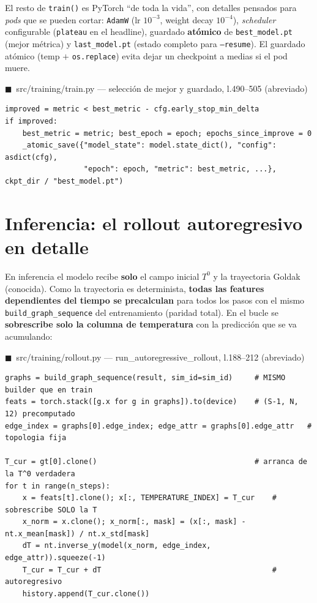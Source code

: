 \documentclass[11pt]{article}
\theoremstyle{definition}
\theoremstyle{plain}
\newcommand{\srcref}[1]{\par\smallskip\noindent
  {\footnotesize\ttfamily\textcolor{srcblue}{$\blacksquare$\ #1}}\par\vspace{1pt}}
\begin{document}
El resto de \texttt{train()} es PyTorch ``de toda la vida'', con detalles pensados
para \emph{pods} que se pueden cortar: \texttt{AdamW} (lr $10^{-3}$, weight decay
$10^{-4}$), \emph{scheduler} configurable (\texttt{plateau} en el headline),
guardado \textbf{atómico} de \texttt{best\_model.pt} (mejor métrica) y
\texttt{last\_model.pt} (estado completo para \texttt{--resume}). El guardado atómico
(temp $+$ \texttt{os.replace}) evita dejar un checkpoint a medias si el pod muere.

\srcref{src/training/train.py — selección de mejor y guardado, l.490--505 (abreviado)}
\begin{lstlisting}
improved = metric < best_metric - cfg.early_stop_min_delta
if improved:
    best_metric = metric; best_epoch = epoch; epochs_since_improve = 0
    _atomic_save({"model_state": model.state_dict(), "config": asdict(cfg),
                  "epoch": epoch, "metric": best_metric, ...}, ckpt_dir / "best_model.pt")
\end{lstlisting}

\section{Inferencia: el rollout autoregresivo en detalle}
\label{sec:rollout}

En inferencia el modelo recibe \textbf{solo} el campo inicial $T^0$ y la trayectoria
Goldak (conocida). Como la trayectoria es determinista, \textbf{todas las features
dependientes del tiempo se precalculan} para todos los pasos con el mismo
\texttt{build\_graph\_sequence} del entrenamiento (paridad total). En el bucle se
\textbf{sobrescribe solo la columna de temperatura} con la predicción que se va
acumulando:

\srcref{src/training/rollout.py — run\_autoregressive\_rollout, l.188--212 (abreviado)}
\begin{lstlisting}
graphs = build_graph_sequence(result, sim_id=sim_id)     # MISMO builder que en train
feats = torch.stack([g.x for g in graphs]).to(device)    # (S-1, N, 12) precomputado
edge_index = graphs[0].edge_index; edge_attr = graphs[0].edge_attr   # topologia fija

T_cur = gt[0].clone()                                    # arranca de la T^0 verdadera
for t in range(n_steps):
    x = feats[t].clone(); x[:, TEMPERATURE_INDEX] = T_cur    # sobrescribe SOLO la T
    x_norm = x.clone(); x_norm[:, mask] = (x[:, mask] - nt.x_mean[mask]) / nt.x_std[mask]
    dT = nt.inverse_y(model(x_norm, edge_index, edge_attr)).squeeze(-1)
    T_cur = T_cur + dT                                       # autoregresivo
    history.append(T_cur.clone())
\end{lstlisting}
\end{document}
